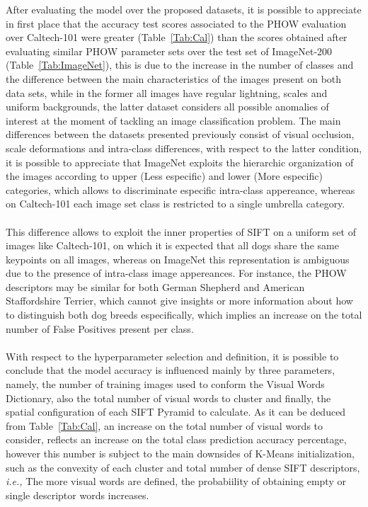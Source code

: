 \documentclass[10pt,twocolumn,letterpaper]{article}
\begin{document}
After evaluating the model over the proposed datasets, it is possible to appreciate in first place that the accuracy test scores associated to the PHOW evaluation over Caltech-101 were greater (Table~\ref{Tab:Cal}) than the scores obtained after evaluating similar PHOW parameter sets over the test set of ImageNet-200 (Table~\ref{Tab:ImageNet}), this is due to the increase in the number of classes and the difference between the main characteristics of the images present on both data sets, while in the former all images have regular lightning, scales and uniform backgrounds, the latter dataset considers all possible anomalies of interest at the moment of tackling an image classification problem. The main differences between the datasets presented previously consist of visual occlusion, scale deformations and intra-class differences, with respect to the latter condition, it is possible to appreciate that ImageNet exploits the hierarchic organization of the images according to upper (Less especific) and lower (More especific) categories, which allows to discriminate especific intra-class appereance, whereas on Caltech-101 each image set class is restricted to a single umbrella category.
\\
\\
This difference allows to exploit the inner properties of SIFT on a uniform set of images like Caltech-101, on which it is expected that all dogs share the same keypoints on all images, whereas on ImageNet this representation is ambiguous due to the presence of intra-class image appereances. For instance, the PHOW descriptors may be similar for both German Shepherd and American Staffordshire Terrier, which cannot give insights or more information about how to distinguish both dog breeds especifically, which implies an increase on the total number of False Positives present per class.
\\
\\
With respect to the hyperparameter selection and definition, it is possible to conclude that the model accuracy is influenced mainly by three parameters, namely, the number of training images used to conform the Visual Words Dictionary, also the total number of visual words to cluster and finally, the spatial configuration of each SIFT Pyramid to calculate.  As it can be deduced from Table~\ref{Tab:Cal}, an increase on the total number of visual words to consider, reflects an increase on the total class prediction accuracy percentage, however this number is subject to the main downsides of K-Means initialization, such as the convexity of each cluster and total number of dense SIFT descriptors, \textit{i.e.,} The more visual words are defined, the probabiility of obtaining empty or single descriptor words increases.
\end{document}
